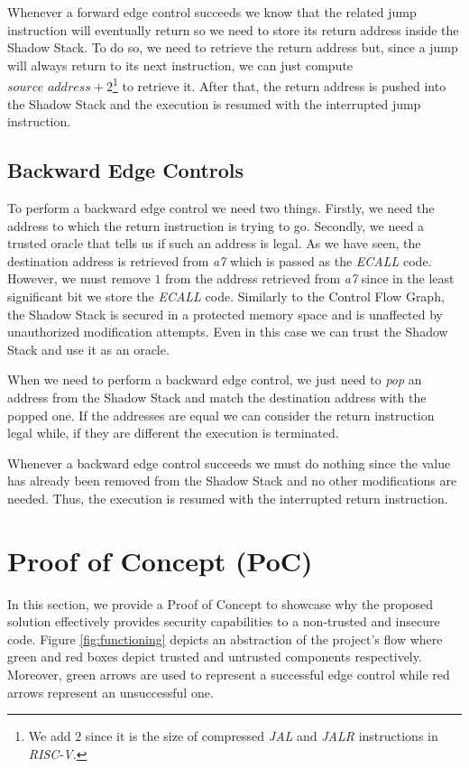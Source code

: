 Whenever a forward edge control succeeds we know that the related jump
instruction will eventually return so we need to store its return address inside
the Shadow Stack. To do so, we need to retrieve the return address but, since a jump
will always return to its next instruction, we can just compute
$\textit{source address}+ 2$\footnote{We add $2$ since it is the size of
compressed \textit{JAL} and \textit{JALR} instructions in \textit{RISC-V}.} to retrieve
it. After that, the return address is pushed into the Shadow Stack and the execution
is resumed with the interrupted jump instruction.

\subsection{Backward Edge Controls}
\label{subsec:backward}

To perform a backward edge control we need two things. Firstly, we need the
address to which the return instruction is trying to go. Secondly, we need a
trusted oracle that tells us if such an address is legal. As we have seen, the
destination address is retrieved from \textit{a7} which is passed as the \textit{ECALL}
code. However, we must remove $1$ from the address retrieved from \textit{a7} since
in the least significant bit we store the \textit{ECALL} code. Similarly to the Control
Flow Graph, the Shadow Stack is secured in a protected memory space and is
unaffected by unauthorized modification attempts. Even in this case we can trust
the Shadow Stack and use it as an oracle.

When we need to perform a backward edge control, we just need to \textit{pop} an
address from the Shadow Stack and match the destination address with the popped one.
If the addresses are equal we can consider the return instruction legal while, if
they are different the execution is terminated.

Whenever a backward edge control succeeds we must do nothing since the value has
already been removed from the Shadow Stack and no other modifications are needed.
Thus, the execution is resumed with the interrupted return instruction.

\section{Proof of Concept (PoC)}
\label{sec:project_poc}

In this section, we provide a Proof of Concept to showcase why the proposed solution
effectively provides security capabilities to a non-trusted and insecure code.
Figure \ref{fig:functioning} depicts an abstraction of the project's flow where
green and red boxes depict trusted and untrusted components respectively. Moreover,
green arrows are used to represent a successful edge control while red arrows
represent an unsuccessful one.

